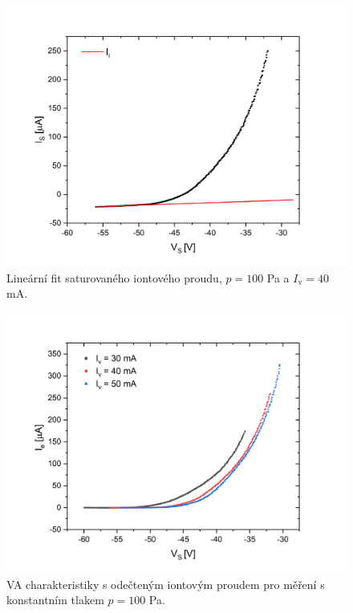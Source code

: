 \documentclass[a4paper,12pt]{article}
\begin{document}
\begin{figure}[h]
	\centering
	\includegraphics[width=145mm]{iiont.png}
	\caption{Lineární fit saturovaného iontového proudu, $p = 100$ \si{\pascal} a $I_\text{v} = 40$ \si{\milli\ampere}.}
	\label{iiont}
\end{figure}

\begin{figure}[h]
	\centering
	\includegraphics[width=145mm]{odectene012.png}
	\caption{VA charakteristiky s odečteným iontovým proudem pro měření s konstantním tlakem $p = 100$ \si{\pascal}.}
	\label{odectene012}
\end{figure}
\end{document}
